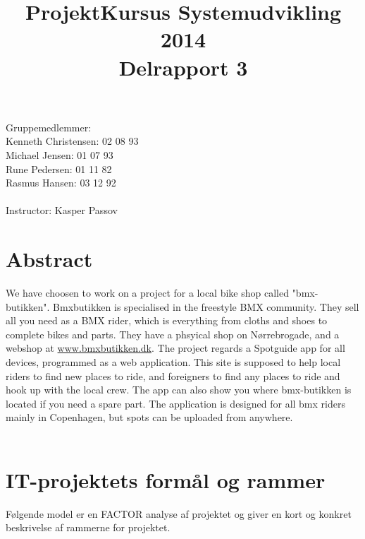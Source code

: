 \documentclass[12pt]{article}
\title{ProjektKursus Systemudvikling 2014\\Delrapport 3}
\author{}
\begin{document}
\maketitle
Gruppemedlemmer:\\
Kenneth Christensen: 02 08 93\\Michael Jensen: 01 07 93\\Rune Pedersen: 01 11 82\\Rasmus Hansen: 03 12 92
\\\\
Instructor: Kasper Passov

\pagebreak
\section{Abstract}
We have choosen to work on a project for a local bike shop called "bmx-butikken". Bmxbutikken is specialised in the freestyle BMX community. They sell all you need as a BMX rider, which is everything from cloths and shoes to complete bikes and parts. They have a phsyical shop on Nørrebrogade, and a webshop at \url{www.bmxbutikken.dk}. The project regards a Spotguide app for all devices, programmed as a web application. This site is supposed to help local riders to find new places to ride, and foreigners to find any places to ride and hook up with the local crew. The app can also show you where bmx-butikken is located if you need a spare part. The application is designed for all bmx riders mainly in Copenhagen, but spots can be uploaded from anywhere. \\\\
\section{IT-projektets formål og rammer}
Følgende model er en FACTOR analyse af projektet og giver en kort og konkret beskrivelse af rammerne for projektet.
\end{document}
